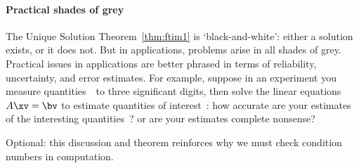 \paragraph{Practical shades of grey}
The Unique Solution Theorem~\ref{thm:ftim1} is `black-and-white': either a solution exists, or it does not.
But in applications, problems arise in all shades of grey.
Practical issues in applications are better phrased in terms of reliability, uncertainty, and error estimates.
For example, suppose in an experiment you measure quantities~\bv\ to three significant digits, then solve the linear equations \(A\xv=\bv\) to estimate quantities of interest~\xv: how accurate are your estimates of the interesting quantities~\xv? or are your estimates complete nonsense?
\begin{aside}
Optional: this discussion and theorem reinforces why we must check condition numbers in computation.
\end{aside}




